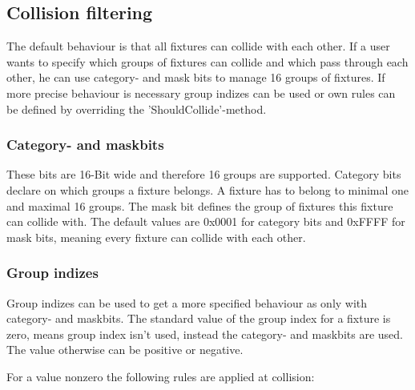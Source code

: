 \documentclass[10pt,a4paper,DIV=11]{scrreprt}
\begin{document}
\subsection{Collision filtering}
The default behaviour is that all fixtures can collide with each other. If a user wants to specify which groups of fixtures can collide and which pass through each other, he can use category- and mask bits to manage 16 groups of fixtures. If more precise behaviour is necessary group indizes can be used or own rules can be defined by overriding the 'ShouldCollide'-method.

\subsubsection*{Category- and maskbits}

These bits are 16-Bit wide and therefore 16 groups are supported.
Category bits declare on which groups a fixture belongs. A fixture has to belong to minimal one and maximal 16 groups.
The mask bit defines the group of fixtures this fixture can collide with. The default values are 0x0001 for category bits and 0xFFFF for mask bits, meaning every fixture can collide with each other.

\subsubsection*{Group indizes}
Group indizes can be used to get a more specified behaviour as only with category- and maskbits.
The standard value of the group index for a fixture is zero, means group index isn't used, instead the category- and maskbits are used. The value otherwise can be positive or negative.

For a value nonzero the following rules are applied at collision: \\

   \\
\\
\end{document}
